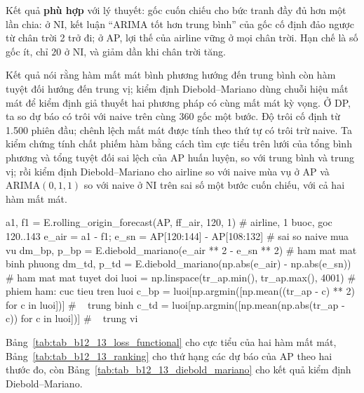  Kết quả \textbf{phù hợp} với lý thuyết: gốc cuốn chiếu cho bức tranh đầy đủ hơn một lần chia: ở NI, kết luận ``ARIMA tốt hơn trung bình'' của gốc cố định đảo ngược từ chân trời 2 trở đi; ở AP, lợi thế của airline vững ở mọi chân trời. Hạn chế là số gốc ít, chỉ $20$ ở NI, và giảm dần khi chân trời tăng.

 Kết quả  nói rằng hàm mất mát bình phương hướng đến trung bình còn hàm tuyệt đối hướng đến trung vị; kiểm định Diebold--Mariano dùng chuỗi hiệu mất mát để kiểm định giả thuyết hai phương pháp có cùng mất mát kỳ vọng.
 Ở DP, ta so dự báo có trôi với naive trên cùng 360 gốc một bước. Độ trôi cố định từ 1.500 phiên đầu; chênh lệch mất mát được tính theo thứ tự có trôi trừ naive. Ta kiểm chứng tính chất phiếm hàm bằng cách tìm cực tiểu trên lưới của tổng bình phương và tổng tuyệt đối sai lệch của AP huấn luyện, so với trung bình và trung vị; rồi kiểm định Diebold--Mariano cho airline so với naive mùa vụ ở AP và ARIMA$(0,1,1)$ so với naive ở NI trên sai số một bước cuốn chiếu, với cả hai hàm mất mát.
\begin{codeblock}
a1, f1 = E.rolling_origin_forecast(AP, ff_air, 120, 1)          # airline, 1 buoc, goc 120..143
e_air = a1 - f1; e_sn = AP[120:144] - AP[108:132]               # sai so naive mua vu
dm_bp, p_bp = E.diebold_mariano(e_air ** 2 - e_sn ** 2)         # ham mat mat binh phuong
dm_td, p_td = E.diebold_mariano(np.abs(e_air) - np.abs(e_sn))   # ham mat mat tuyet doi
luoi = np.linspace(tr_ap.min(), tr_ap.max(), 4001)              # phiem ham: cuc tieu tren luoi
c_bp = luoi[np.argmin([np.mean((tr_ap - c) ** 2) for c in luoi])]      # ~ trung binh
c_td = luoi[np.argmin([np.mean(np.abs(tr_ap - c)) for c in luoi])]     # ~ trung vi
\end{codeblock}
 Bảng~\ref{tab:tab_b12_13_loss_functional} cho cực tiểu của hai hàm mất mát, Bảng~\ref{tab:tab_b12_13_ranking} cho thứ hạng các dự báo của AP theo hai thước đo, còn Bảng~\ref{tab:tab_b12_13_diebold_mariano} cho kết quả kiểm định Diebold--Mariano.



